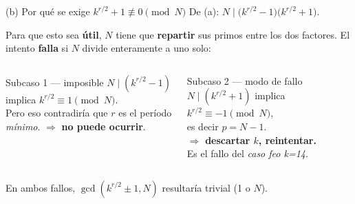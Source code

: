 \documentclass[aspectratio=169]{beamer}
\begin{document}
\begin{frame}{(b) Por qué se exige $k^{r/2}+1\not\equiv 0\pmod{N}$}
  De (a): $N\mid\bigl(k^{r/2}-1\bigr)\bigl(k^{r/2}+1\bigr)$.

  Para que esto sea \textbf{útil}, $N$ tiene que \textbf{repartir} sus primos
  entre los dos factores. El intento \textbf{falla} si $N$ divide
  enteramente a uno solo:

  \vspace{0.3em}
  \begin{columns}[T]
    \begin{exampleblock}{Subcaso 1 — imposible}
      $N\mid(k^{r/2}-1)$ implica $k^{r/2}\equiv 1\pmod{N}$.\\
      Pero eso contradiría que $r$ es el período \emph{mínimo}.
      $\Rightarrow$ \textbf{no puede ocurrir}.
    \end{exampleblock}

    \begin{alertblock}{Subcaso 2 — modo de fallo}
      $N\mid(k^{r/2}+1)$ implica $k^{r/2}\equiv -1\pmod{N}$,\\
      es decir $p=N-1$.\\
      $\Rightarrow$ \textbf{descartar $k$, reintentar.}\\
      Es el fallo del \emph{caso feo k=14}.
    \end{alertblock}
  \end{columns}

  \vspace{0.3em}
  En ambos fallos, $\gcd(k^{r/2}\pm1,N)$ resultaría trivial (1 o $N$).

\end{frame}
\end{document}
